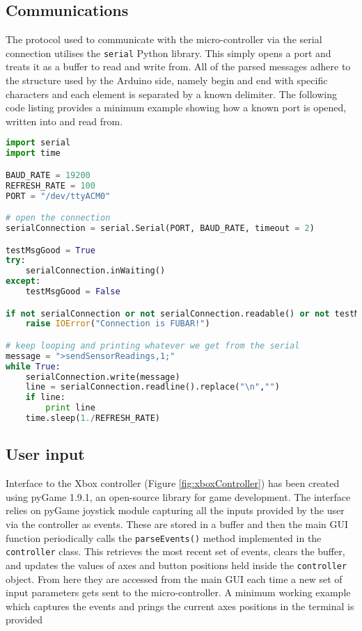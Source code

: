 \subsection{Communications}
The protocol used to communicate with the micro-controller via the serial connection
utilises the \texttt{serial} Python library. This simply opens a port and treats
it as a buffer to read and write from. All of the parsed messages adhere to the
structure used by the Arduino side, namely begin and end with specific characters
and each element is separated by a known delimiter. The following code listing
provides a minimum example showing how a known port is opened, written into and
read from.

\begin{lstlisting}[style=myPythonStyle,language=Python]
import serial
import time

BAUD_RATE = 19200
REFRESH_RATE = 100
PORT = "/dev/ttyACM0"

# open the connection
serialConnection = serial.Serial(PORT, BAUD_RATE, timeout = 2)

testMsgGood = True
try:
    serialConnection.inWaiting()
except:
    testMsgGood = False

if not serialConnection or not serialConnection.readable() or not testMsgGood:
    raise IOError("Connection is FUBAR!")

# keep looping and printing whatever we get from the serial
message = ">sendSensorReadings,1;"
while True:
	serialConnection.write(message)
    line = serialConnection.readline().replace("\n","")
    if line:
        print line
    time.sleep(1./REFRESH_RATE)
\end{lstlisting}

\subsection{User input}
Interface to the Xbox controller (Figure \ref{fig:xboxController}) has been
created using pyGame 1.9.1, an open-source library for game development.
The interface relies on pyGame joystick module capturing all the inputs provided
by the user via the controller as events. These are stored in a buffer and then
the main GUI function periodically calls the \texttt{parseEvents()} method implemented
in the \texttt{controller} class. This retrieves the most recent set of events,
clears the buffer, and updates the values of axes and button positions held
inside the \texttt{controller} object. From here they are accessed from the main GUI each time a new
set of input parameters gets sent to the micro-controller.
A minimum working example which captures the events and prings the current axes
positions in the terminal is provided

